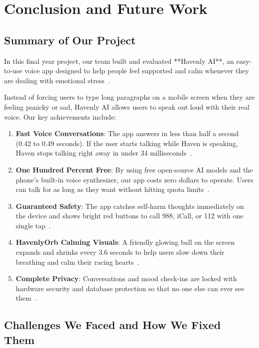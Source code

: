 \chapter{Conclusion and Future Work}
\label{chap:conclusion}

\section{Summary of Our Project}
\label{sec:concl_summary}

In this final year project, our team built and evaluated **Havenly AI**, an easy-to-use voice app designed to help people feel supported and calm whenever they are dealing with emotional stress~\cite{who2022mentalhealth,nimhans2016nmhs}.

Instead of forcing users to type long paragraphs on a mobile screen when they are feeling panicky or sad, Havenly AI allows users to speak out loud with their real voice. Our key achievements include:
\begin{enumerate}
    \item \textbf{Fast Voice Conversations}: The app answers in less than half a second (0.42 to 0.49 seconds). If the user starts talking while Haven is speaking, Haven stops talking right away in under 34 milliseconds~\cite{johnston2018vad}.
    \item \textbf{One Hundred Percent Free}: By using free open-source AI models and the phone's built-in voice synthesizer, our app costs zero dollars to operate. Users can talk for as long as they want without hitting quota limits~\cite{openrouter2024docs}.
    \item \textbf{Guaranteed Safety}: The app catches self-harm thoughts immediately on the device and shows bright red buttons to call 988, iCall, or 112 with one single tap~\cite{miner2016smartphone,nist2023airmf}.
    \item \textbf{HavenlyOrb Calming Visuals}: A friendly glowing ball on the screen expands and shrinks every 3.6 seconds to help users slow down their breathing and calm their racing hearts~\cite{balban2023respiration}.
    \item \textbf{Complete Privacy}: Conversations and mood check-ins are locked with hardware security and database protection so that no one else can ever see them~\cite{supabase2024rls}.
\end{enumerate}

\section{Challenges We Faced and How We Fixed Them}
\label{sec:concl_challenges}

